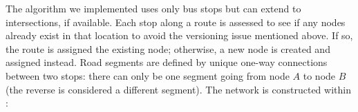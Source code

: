 The algorithm we implemented uses only bus stops but can extend to intersections, if available. Each stop along a route is assessed to see if any nodes already exist in that location to avoid the versioning issue mentioned above. If so, the route is assigned the existing node; otherwise, a new node is created and assigned instead. Road segments are defined by unique one-way connections between two stops: there can only be one segment going from node $A$ to node $B$ (the reverse is considered a different segment). The network is constructed within :
\begin{knitrout}\small
{}\color{fgcolor}
\end{knitrout}
